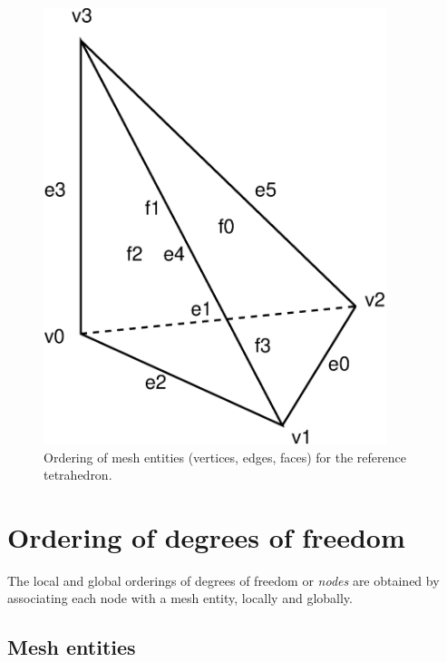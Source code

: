 \begin{figure}[htbp]
  \begin{center}
    \includegraphics[width=10cm]{eps/reference_tetrahedron_entities.eps}
    \caption{Ordering of mesh entities (vertices, edges, faces) for the reference tetrahedron.}
    \label{fig:reference_tetrahedron_entities}
  \end{center}
\end{figure}

\section{Ordering of degrees of freedom}

The local and global orderings of degrees of freedom or \emph{nodes} are
obtained by associating each node with a mesh entity, locally and
globally.

\subsection{Mesh entities}

